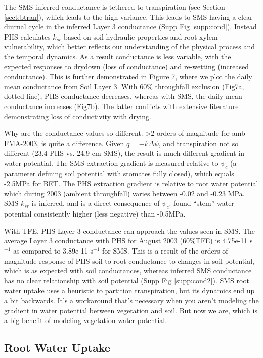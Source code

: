\documentclass[draft,linenumbers]{agujournal}
\begin{document}
The SMS inferred conductance is tethered to transpiration (see Section \ref{sect:btran}), which leads to the high variance.
This leads to SMS having a clear diurnal cycle in the inferred Layer 3 conductance (Supp Fig \ref{supp:cond}). 
Instead PHS calculates $k_{sr}$ based on soil hydraulic properties and root xylem vulnerability, 
which better reflects our understanding of the physical process and the temporal dynamics.
As a result conductance is less variable, with the expected responses to drydown (loss of conductance) and re-wetting (increased conductance).
This is further demonstrated in Figure 7, where we plot the daily mean conductance from Soil Layer 3.
With 60\% throughfall exclusion (Fig7a, dotted line), PHS conductance decreases, whereas with SMS, the daily mean conductance increases (Fig7b).
The latter conflicts with extensive literature demonstrating loss of conductivity with drying.

Why are the conductance values so different. >2 orders of magnitude for amb-FMA-2003, is quite a difference. 
Given $q=-k\Delta\psi$, and transpiration not so different (23.4 PHS vs. 24.9 cm SMS), the result is much different gradient in water potential.
The SMS extraction gradient is measured relative to $\psi_c$ (a parameter defining soil potential with stomates fully closed), which equals -2.5MPa for BET.
The PHS extraction gradient is relative to root water potential which during 2003 (ambient throughfall) varies between -0.02 and -0.23 MPa.
SMS $k_{sr}$ is inferred, and is a direct consequence of $\psi_c$.
\citet{fisher2006} found ``stem'' water potential consistently higher (less negative) than -0.5MPa.

With TFE, PHS Layer 3 conductance can approach the values seen in SMS. 
The average Layer 3 conductance with PHS for August 2003 (60\%TFE) is 4.75e-11 s$^{-1}$ as compared to 3.89e-11 s$^{-1}$ for SMS.
This is a result of the orders of magnitude response of PHS soil-to-root conductance to changes in soil potential, which is as expected with soil conductances,
whereas inferred SMS conductance has no clear relationship with soil potential (Supp Fig \ref{supp:cond2}). 
SMS root water uptake uses a heuristic to partition transpiration, but its dynamics end up a bit backwards. 
It's a workaround that's necessary when you aren't modeling the gradient in water potential between vegetation and soil. 
But now we are, which is a big benefit of modeling vegetation water potential.

\subsection{Root Water Uptake}
\end{document}

